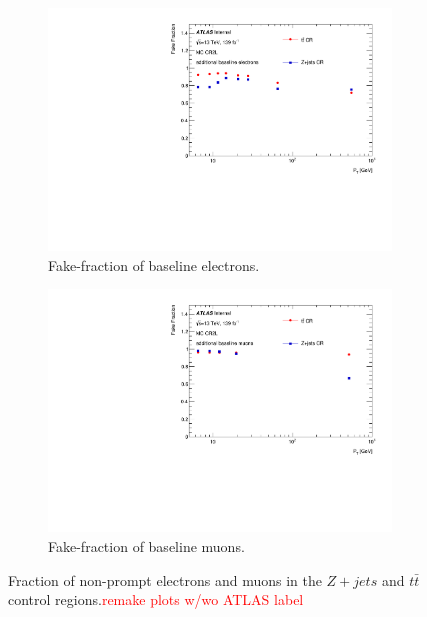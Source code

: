 \begin{figure}[htb]
    \begin{subfigure}{.48\textwidth}
        \centering
        \includegraphics[width=.9\linewidth]{figures/Analysis/Background/FakeFractionBaselineElectrons.pdf}
        \caption{Fake-fraction of baseline electrons.}
    \end{subfigure}
    \begin{subfigure}{.48\textwidth}
        \centering
        \includegraphics[width=.9\linewidth]{figures/Analysis/Background/FakeFractionBaselineMuons.pdf}
        \caption{Fake-fraction of baseline muons.}
    \end{subfigure}
        \caption{Fraction of non-prompt electrons and muons in the $Z+jets$ and $t\bar{t}$ control regions.\textcolor{red}{remake plots w/wo ATLAS label} \label{fig:FakeFractionBaseline}}
\end{figure}

